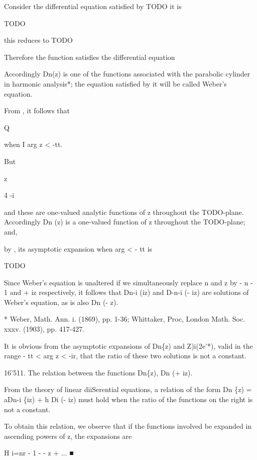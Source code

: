 
Consider the differential equation satisfied by TODO it is

TODO

this reduces to TODO

Therefore the function satisfies the differential equation

Accordingly Dn(z) is one of the functions associated with the
parabolic cylinder in harmonic analysis*; the equation satisfied by it
will be called Weber's equation.

From , it follows that

Q

when I arg z < -tt.

But

z

4 -i

and these are one-valued analytic functions of z throughout the
TODO-plane. Accordingly Dn (z) is a one-valued function of z
throughout the TODO-plane; and,

by , its asymptotic expansion when arg  < - tt is

TODO


Since Weber's equation is unaltered if we simultaneously replace n and
z by - n - 1 and + iz respectively, it follows that Dn-i (iz) and
D-n-i (- iz) are solutions of Weber's equation, as is also Dn (- z).

* Weber, Math. Ann. i. (1869), pp. 1-36; Whittaker, Proc, London Math.
Soc. xxxv. (1903), pp. 417-427.

%
%

It is obvious from the asymptotic expansions of Dn\{z) and
Z)i(2e'*), valid in the range -  tt < arg z < -ir, that the
ratio of these two solutions is not a constant.

16'511. The relation between the functions Dn\{z), Dn (+ iz).

From the theory of linear diiSerential equations, a relation of the
form Dn \{z) = aDn-i \{iz) + h Di (- iz) must hold when the
ratio of the functions on the right is not a constant.

To obtain this relation, we observe that if the functions involved be
expanded in ascending powers of z, the expansions are

H i=nr - 1 -  - z + ... ■

